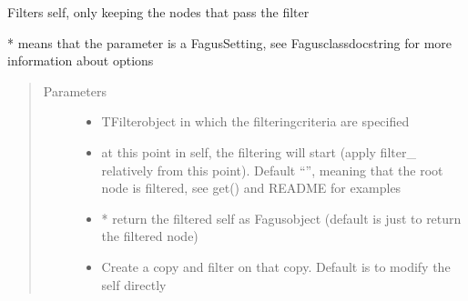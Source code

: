 \documentclass[a4paper,10pt,english]{sphinxmanual}
\begin{document}
\begin{fulllineitems}
\begin{fulllineitems}
\label{\detokenize{fagus.fagus:fagus.fagus.Fagus.filter}}
\pysigstartsignatures
{}
\pysigstopsignatures
\sphinxAtStartPar
Filters self, only keeping the nodes that pass the filter

\sphinxAtStartPar
* means that the parameter is a Fagus\sphinxhyphen{}Setting, see Fagus\sphinxhyphen{}class\sphinxhyphen{}docstring for more information about options
\begin{quote}\begin{description}
\item[{Parameters}] \leavevmode\begin{itemize}
\item {}
\sphinxAtStartPar
{} \textendash{} TFilter\sphinxhyphen{}object in which the filtering\sphinxhyphen{}criteria are specified

\item {}
\sphinxAtStartPar
{} \textendash{} at this point in self, the filtering will start (apply filter\_ relatively from this point).
Default “”, meaning that the root node is filtered, see get() and README for examples

\item {}
\sphinxAtStartPar
{} \textendash{} * return the filtered self as Fagus\sphinxhyphen{}object (default is just to return the filtered node)

\item {}
\sphinxAtStartPar
{} \textendash{} Create a copy and filter on that copy. Default is to modify the self directly


\end{itemize}
\end{description}
\end{quote}
\end{fulllineitems}
\end{fulllineitems}
\end{document}
